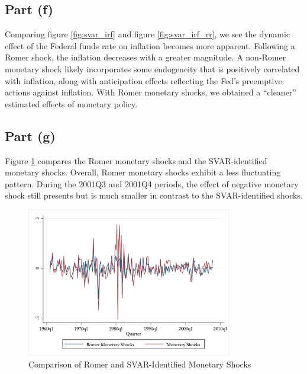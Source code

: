 \documentclass[12pt]{article}
\begin{document}
\subsection*{Part (f)} 

Comparing figure \ref{fig:svar_irf} and figure \ref{fig:svar_irf_rr}, 
we see the dynamic effect of the Federal funds rate on inflation becomes more apparent. Following a Romer shock, the inflation decreases with a greater magnitude. 
A non-Romer monetary shock likely incorporates some endogeneity that is positively correlated with inflation, 
along with anticipation effects reflecting the Fed's preemptive actions against inflation. 
With Romer monetary shocks, we obtained a ``cleaner'' estimated effects of monetary policy. 

\subsection*{Part (g)} 

Figure \ref{fig:compare_shocks} compares the Romer monetary shocks and the SVAR-identified monetary shocks. 
Overall, Romer monetary shocks exhibit a less fluctuating pattern. 
During the 2001Q3 and 2001Q4 periods, the effect of negative monetary shock still presents but is much smaller in contrast to the SVAR-identified shocks.

\begin{figure}[ht]
    \centering
    \includegraphics[width=0.8\textwidth]{figs/compare_monetary_shocks}
    \caption{Comparison of Romer and SVAR-Identified Monetary Shocks}
    \label{fig:compare_shocks}
\end{figure}
\end{document}
